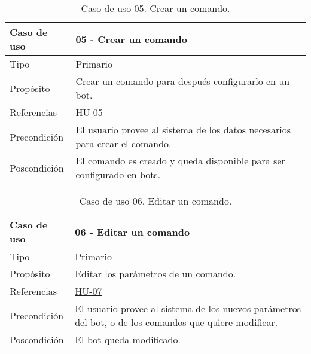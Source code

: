 \begin{table}[H]
    \centering
    \def\arraystretch{1.25}
    \begin{adjustbox}{max width=\textwidth}
    \begin{tabularx}{\textwidth}{|l|L|}
    \hline
        \textbf{Caso de uso} & \textbf{05 - Crear un comando} \\ \hline
    \hline
        Tipo & Primario \\ \hline
        Propósito & Crear un comando para después configurarlo en un bot. \\ \hline
        Referencias & \hyperref[sec:hu05]{HU-05} \\ \hline
        Precondición & El usuario provee al sistema de los datos necesarios para crear el comando. \\ \hline
        Poscondición & El comando es creado y queda disponible para ser configurado en bots. \\ \hline
    \end{tabularx}
    \end{adjustbox}
    \caption{Caso de uso 05. Crear un comando.}
\end{table}

\begin{table}[H]
    \centering
    \def\arraystretch{1.25}
    \begin{adjustbox}{max width=\textwidth}
    \begin{tabularx}{\textwidth}{|l|L|}
    \hline
        \textbf{Caso de uso} & \textbf{06 - Editar un comando} \\ \hline
    \hline
        Tipo & Primario \\ \hline
        Propósito & Editar los parámetros de un comando. \\ \hline
        Referencias & \hyperref[sec:hu07]{HU-07} \\ \hline
        Precondición & El usuario provee al sistema de los nuevos parámetros del bot, o de los comandos que quiere modificar. \\ \hline
        Poscondición & El bot queda modificado. \\ \hline
    \end{tabularx}
    \end{adjustbox}
    \caption{Caso de uso 06. Editar un comando.}
\end{table}

